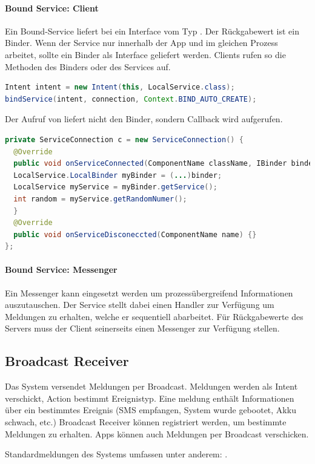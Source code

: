 \paragraph{Bound Service: Client} Ein Bound-Service liefert bei  ein Interface vom Typ .
Der Rückgabewert ist ein Binder.
Wenn der Service nur innerhalb der App und im gleichen Prozess arbeitet, sollte ein Binder als Interface geliefert werden. Clients rufen so die Methoden des Binders oder des Services auf.
\begin{lstlisting}[language=java]
Intent intent = new Intent(this, LocalService.class);
bindService(intent, connection, Context.BIND_AUTO_CREATE);
\end{lstlisting}
Der Aufruf von  liefert nicht den  Binder, sondern Callback  wird aufgerufen.
\begin{lstlisting}[language=java]
private ServiceConnection c = new ServiceConnection() {
  @Override
  public void onServiceConnected(ComponentName className, IBinder binder) {
  LocalService.LocalBinder myBinder = (...)binder;
  LocalService myService = myBinder.getService();
  int random = myService.getRandomNumer();
  }
  @Override
  public void onServiceDisconeccted(ComponentName name) {}
};
\end{lstlisting}

\paragraph{Bound Service: Messenger} Ein Messenger kann eingesetzt werden um prozessübergreifend Informationen auszutauschen. Der Service stellt dabei einen Handler zur Verfügung um Meldungen zu erhalten, welche er sequentiell abarbeitet. Für Rückgabewerte des Servers muss der Client seinerseits einen Messenger zur Verfügung stellen.


\subsection{Broadcast Receiver} Das System versendet Meldungen per Broadcast. Meldungen werden als Intent verschickt, Action bestimmt Ereignistyp. Eine meldung enthält Informationen über ein bestimmtes Ereignis (SMS empfangen, System wurde gebootet, Akku schwach, etc.) Broadcast Receiver können registriert werden, um bestimmte Meldungen zu erhalten. Apps können auch Meldungen per Broadcast verschicken.

Standardmeldungen des Systems umfassen unter anderem: .

